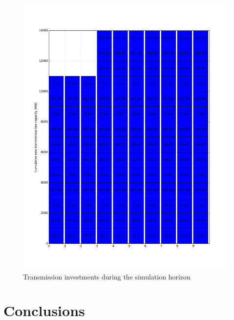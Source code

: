 \documentclass[final]{IEEEtran}
\begin{document}
\begin{figure}[htpb]
	\centering
	\includegraphics[width=\linewidth]{transmission_investment_milp_dc_miqp_dc.png}
	\caption{Transmission investments during the simulation horizon}
	\label{fig_transmission_investment}
\end{figure}

\section{Conclusions}
\label{section_conclusions}




\end{document}
